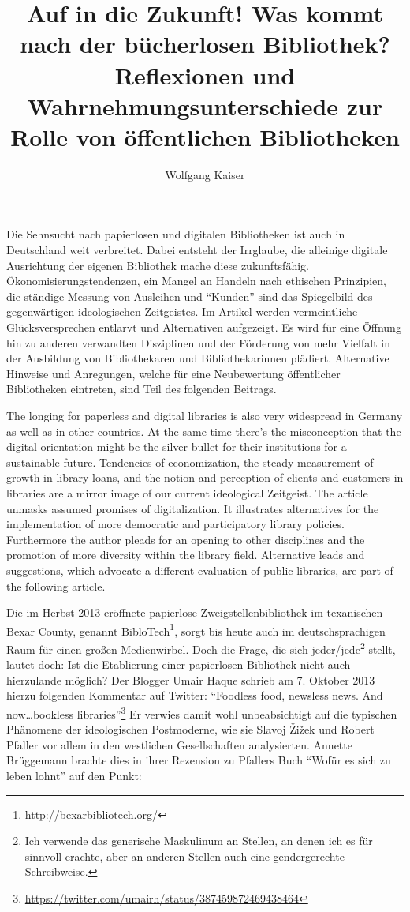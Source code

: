 \documentclass[a4paper,
fontsize=11pt,
oneside,
numbers=noperiodatend,
parskip=half-,
bibliography=totoc,
final
]{scrartcl}
\title{\LARGE{Auf in die Zukunft! Was kommt nach der bücherlosen Bibliothek? Reflexionen und Wahrnehmungsunterschiede zur Rolle von öffentlichen Bibliotheken}} %
\author{Wolfgang Kaiser} %
\date{}
\begin{document}
\maketitle
\thispagestyle{fancyplain} 


Die Sehnsucht nach papierlosen und digitalen Bibliotheken ist auch in
Deutschland weit verbreitet. Dabei entsteht der Irrglaube, die alleinige
digitale Ausrichtung der eigenen Bibliothek mache diese zukunftsfähig.
Ökonomisierungstendenzen, ein Mangel an Handeln nach ethischen
Prinzipien, die ständige Messung von Ausleihen und \enquote{Kunden} sind
das Spiegelbild des gegenwärtigen ideologischen Zeitgeistes. Im Artikel
werden vermeintliche Glücksversprechen entlarvt und Alternativen
aufgezeigt. Es wird für eine Öffnung hin zu anderen verwandten
Disziplinen und der Förderung von mehr Vielfalt in der Ausbildung von
Bibliothekaren und Bibliothekarinnen plädiert. Alternative Hinweise und
Anregungen, welche für eine Neubewertung öffentlicher Bibliotheken
eintreten, sind Teil des folgenden Beitrags.

The longing for paperless and digital libraries is also very widespread
in Germany as well as in other countries. At the same time there's the
misconception that the digital orientation might be the silver bullet
for their institutions for a sustainable future. Tendencies of
economization, the steady measurement of growth in library loans, and
the notion and perception of clients and customers in libraries are a
mirror image of our current ideological Zeitgeist. The article unmasks
assumed promises of digitalization. It illustrates alternatives for the
implementation of more democratic and participatory library policies.
Furthermore the author pleads for an opening to other disciplines and
the promotion of more diversity within the library field. Alternative
leads and suggestions, which advocate a different evaluation of public
libraries, are part of the following article.

Die im Herbst 2013 eröffnete papierlose Zweigstellenbibliothek im
texanischen Bexar County, genannt BibloTech\footnote{\url{http://bexarbibliotech.org/}},
sorgt bis heute auch im deutschsprachigen Raum für einen großen
Medienwirbel. Doch die Frage, die sich jeder/jede\footnote{Ich verwende
  das generische Maskulinum an Stellen, an denen ich es für sinnvoll
  erachte, aber an anderen Stellen auch eine gendergerechte
  Schreibweise.} stellt, lautet doch: Ist die Etablierung einer
papierlosen Bibliothek nicht auch hierzulande möglich? Der Blogger Umair
Haque schrieb am 7. Oktober 2013 hierzu folgenden Kommentar auf Twitter:
\enquote{Foodless food, newsless news. And now\ldots{}bookless
libraries}\footnote{\url{https://twitter.com/umairh/status/387459872469438464}}
Er verwies damit wohl unbeabsichtigt auf die typischen Phänomene der
ideologischen Postmoderne, wie sie Slavoj Žižek und Robert Pfaller vor
allem in den westlichen Gesellschaften analysierten. Annette Brüggemann
brachte dies in ihrer Rezension zu Pfallers Buch \enquote{Wofür es sich
zu leben lohnt} auf den Punkt:~
\end{document}
